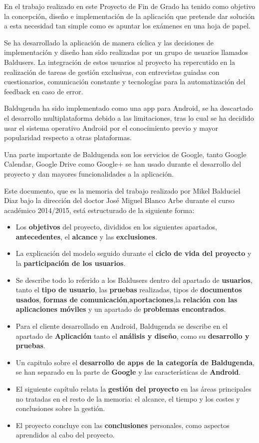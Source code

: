 En el trabajo realizado en este Proyecto de Fin de Grado ha tenido como objetivo la concepción, diseño e implementación de la aplicación que pretende dar solución a esta necesidad tan simple como es apuntar los exámenes en una hoja de papel.

Se ha desarrollado la aplicación de manera cíclica y las decisiones de implementación y diseño han sido realizadas por un grupo de usuarios llamados Baldusers. La integración de estos usuarios al proyecto ha repercutido en la realización de tareas de gestión exclusivas, con entrevistas guiadas con cuestionarios, comunicación constante y tecnologías para la automatización del feedback en caso de error.

Baldugenda ha sido implementado como una app para Android, se ha descartado el desarrollo multiplataforma debido a las limitaciones, tras lo cual se ha decidido usar el sistema operativo Android por el conocimiento previo y mayor popularidad respecto a otras plataformas.

Una parte importante de Baldugenda son los servicios de Google, tanto Google Calendar, Google Drive como Google+ se han usado durante el desarrollo del proyecto y dan mayores funcionalidades a la aplicación.

Este documento, que es la memoria del trabajo realizado por Mikel Balduciel Diaz
bajo la dirección del doctor José Miguel Blanco Arbe durante el curso académico 2014/2015, está estructurado de la siguiente forma:

\begin{itemize}
	\item Los \textbf{objetivos} del proyecto, divididos en los siguientes apartados, \textbf{antecedentes}, el \textbf{alcance} y las \textbf{exclusiones}.
	\item La explicación del modelo seguido durante el \textbf{ciclo de vida del proyecto} y la \textbf{participación de los usuarios}.
	\item Se describe todo lo referido a los Baldusers dentro del apartado de \textbf{usuarios}, tanto el \textbf{tipo de usuario}, las \textbf{pruebas} realizadas, tipos de \textbf{documentos usados}, \textbf{formas de comunicación},\textbf{aportaciones},la \textbf{relación con las aplicaciones móviles} y un apartado de \textbf{problemas encontrados}.
	\item Para el cliente desarrollado en Android, Baldugenda se describe en el apartado de \textbf{Aplicación} tanto el \textbf{análisis y diseño}, como su \textbf{desarrollo y pruebas}.
	\item Un capitulo sobre el \textbf{desarrollo de apps de la categoría de Baldugenda}, se han separado en la parte de \textbf{Google} y las características de \textbf{Android}.
	\item El siguiente capítulo relata la \textbf{gestión del proyecto} en las áreas principales no tratadas en el resto de la memoria: el alcance, el tiempo y los costes y conclusiones sobre la gestión.
	\item El proyecto concluye con las \textbf{conclusiones} personales, como aspectos aprendidos al cabo del proyecto.
\end{itemize}

